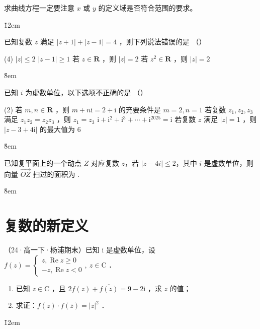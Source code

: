 \begin{tips}
    求曲线方程一定要注意 $x$ 或 $y$ 的定义域是否符合范围的要求。
\end{tips}

\v{12em}

\begin{example}
    已知复数 $z$ 满足 $|z+1|+|z-1|=4$ ，则下列说法错误的是 （\qquad）
    \begin{tasks}(4)
        \task $|z| \leq 2$
        \task $|z-1| \geq 1$
        \task 若 $z \in \mathbf{R}$ ，则 $|z|=2$
        \task 若 $z^2 \in \mathbf{R}$ ，则 $|z|=2$
    \end{tasks}
\end{example}

\v{8em}

\begin{example}
    已知 $i$ 为虚数单位，以下选项不正确的是 （\qquad）
    \begin{tasks}(2)
        \task 若 $m, n \in \mathbf{R}$ ，则 $m+n \mathrm{i}=2+\mathrm{i}$ 的充要条件是 $m=2, n=1$
        \task 若复数 $z_1, z_2, z_3$ 满足 $z_1 z_2=z_2 z_3$ ，则 $z_1=z_3$
        \task $\mathrm{i}+\mathrm{i}^2+\mathrm{i}^3+\cdots+\mathrm{i}^{2025}=\mathrm{i}$
        \task 若复数 $z$ 满足 $|z|=1$ ，则 $|z-3+4 \mathrm{i}|$ 的最大值为 $6$
    \end{tasks}
\end{example}

\v{8em}

\begin{example}
    已知复平面上的一个动点 $Z$ 对应复数 $z$，若 $|z-4i| \leq 2$，其中 $i$ 是虚数单位，则向量 $\overrightarrow{OZ}$ 扫过的面积为 \underline{\qquad}.
\end{example}

\v{8em}

\section{复数的新定义}

\begin{example}
    （24·高一下·杨浦期末）已知 $\mathrm{i}$ 是虚数单位，设 $f(z)=\left\{\begin{array}{c}z, \operatorname{Re} z \geq 0 \\ -z, \operatorname{Re} z<0\end{array}, ~ z \in \mathrm{C}\right.$ ．
    \begin{enumerate}
        \item 已知 $z \in \mathrm{C}$ ，且 $2 f(z)+\overline{f(z)}=9-2 \mathrm{i}$ ，求 $z$ 的值；
        \item 求证：$f(z) \cdot f(\bar{z})=|z|^2$ ．
    \end{enumerate}
\end{example}

\v{12em}
